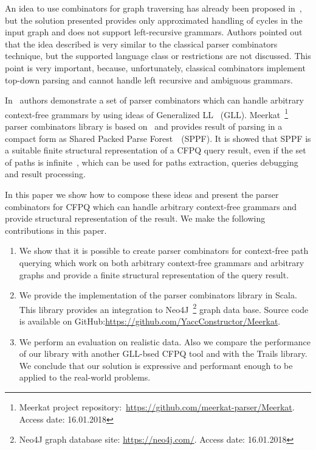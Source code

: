 An idea to use combinators for graph traversing has already been proposed in~\cite{ScalaGraphParsing}, but the solution presented provides only approximated handling of cycles in the input graph and does not support left-recursive grammars. 
Authors pointed out that the idea described is very similar to the classical parser combinators technique, but the supported language class or restrictions are not discussed.
This point is very important, because, unfortunately, classical combinators implement top-down parsing and cannot handle left recursive and ambiguous grammars.

In~\cite{Meerkat} authors demonstrate a set of parser combinators which can handle arbitrary context-free grammars by using ideas of Generalized LL~\cite{scott2010gll} (GLL).
Meerkat~\footnote{Meerkat project repository:~\url{https://github.com/meerkat-parser/Meerkat}. Access date: 16.01.2018} parser combinators library is based on~\cite{Meerkat}
 and provides result of parsing in a compact form as Shared Packed Parse Forest~\cite{SPPF}~(SPPF).
It is showed that SPPF is a suitable finite structural representation of a CFPQ query result, even if the set of paths is infinite~\cite{GrigorevR16}, which can be used for paths extraction, queries debugging and result processing.

In this paper we show how to compose these ideas and present the parser combinators for CFPQ which can handle arbitrary context-free grammars and provide structural representation of the result.
We make the following contributions in this paper.

\begin{enumerate}
\item We show that it is possible to create parser combinators for context-free path querying which work on both arbitrary context-free grammars and arbitrary graphs and provide a finite structural representation of the query result.
\item We provide the implementation of the parser combinators library in Scala. This library provides an integration to Neo4J~\footnote{Neo4J graph database site: \url{https://neo4j.com/}. Access date: 16.01.2018} graph data base. Source code is available on GitHub:\url{https://github.com/YaccConstructor/Meerkat}.
\item We perform an evaluation on realistic data. 
Also we compare the performance of our library with another GLL-bsed CFPQ tool and with the Trails library.
We conclude that our solution is expressive and performant enough to be applied to the real-world problems. 
\end{enumerate}